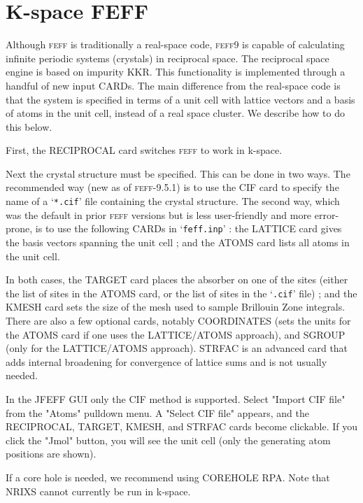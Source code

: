 \documentclass[11pt,oneside]{report} %
\newcommand{\program}[1]{\textsc{#1}}
\newcommand{\feff}{\program{feff}}
\newcommand{\vnum}{9}
\newcommand{\feffcur}{\feff\vnum}
\newcommand{\file}[1]{`\texttt{#1}'}
\begin{document}
\section{K-space FEFF}
\label{sec:kspace}

Although {\feff} is traditionally a real-space code, {\feffcur} is capable of calculating infinite periodic systems (crystals) in
reciprocal space.  The reciprocal space engine is based on impurity KKR.  This functionality is implemented through a handful of new input CARDs.  The main difference from the real-space code is that the system is specified in terms of a unit cell with lattice vectors and a basis of atoms in the unit cell, instead of a real space cluster.  We  describe how to do this below.

First, the RECIPROCAL card switches {\feff} to work in k-space.  

Next the crystal structure must be specified.  This can be done in two ways.  The recommended way (new as of {\feff}-9.5.1) is to use the CIF card to specify the name of a \file{*.cif} file containing the crystal structure.  The second way, which was the default in prior {\feff} versions but is less user-friendly and more error-prone, is to use the following CARDs in \file{feff.inp} : the LATTICE card gives the basis vectors spanning the unit cell ; and the ATOMS card lists all atoms in the unit cell. 

In both cases, the TARGET card places the absorber on one of the sites (either the list of sites in the ATOMS card, or the list of sites in the \file{.cif} file) ; and the KMESH card sets the size of the mesh used to sample Brillouin Zone integrals.  There are also a few optional cards, notably COORDINATES (sets the units for the ATOMS card if one uses the LATTICE/ATOMS approach), and SGROUP (only for the LATTICE/ATOMS approach).  STRFAC is an advanced card that adds internal broadening for convergence of lattice sums and is not usually needed.

In the JFEFF GUI only the CIF method is supported.  Select "Import CIF file" from the "Atoms" pulldown menu.  A "Select CIF file" appears, and the RECIPROCAL, TARGET, KMESH, and STRFAC cards become clickable.  If you click the "Jmol" button, you will see the unit cell (only the generating atom positions are shown).

If a core hole is needed, we recommend using COREHOLE RPA.  Note that NRIXS cannot currently be run in k-space.
\end{document}
